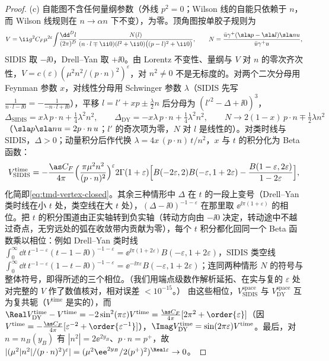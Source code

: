 \begin{proof}
(c) 自能图不含任何量纲参数（外线 $p^2=0$；Wilson 线的自能只依赖于 $n$，而 Wilson 线规则在 $n\to\alpha n$ 下不变），为零。顶角图按单胶子规则为
\[
V=\ii g^2C_F\mu^{2\varepsilon}\!\int\!\frac{\dd^Dl}{(2\pi)^D}\,\frac{N(l)}{(n\cdot l\mp\ii0)(l^2+\ii0)\big((p-l)^2+\ii0\big)},\qquad N=\frac{\bar u\gamma^+(\sla p-\sla l)\sla n u}{\bar u\gamma^+u},
\]
SIDIS 取 $-\ii0$，Drell--Yan 取 $+\ii0$。由 Lorentz 不变性、量纲与 $V$ 对 $n$ 的零次齐次性，$V=c(\varepsilon)(\mu^2n^2/(p\cdot n)^2)^\varepsilon$，对 $n^2\neq0$ 不是无标度的。对两个二次分母用 Feynman 参数 $x$，对线性分母用 Schwinger 参数 $\lambda$（SIDIS 先写 $\frac1{n\cdot l-\ii0}=-\frac1{-n\cdot l+\ii0}$），平移 $l=l'+xp\pm\frac\lambda2n$ 后分母为 $(l'^2-\Delta+\ii0)^3$，
\[
\Delta_{\mathrm{SIDIS}}=x\lambda\,p\cdot n+\tfrac14\lambda^2n^2,\qquad \Delta_{\mathrm{DY}}=-x\lambda\,p\cdot n+\tfrac14\lambda^2n^2,\qquad N\to2(1-x)\,p\cdot n\mp\tfrac12\lambda n^2
\]
（$\sla p\sla n u=2p\cdot n\,u$；$l'$ 的奇次项为零，$N$ 对 $l$ 是线性的）。对类时线与 SIDIS，$\Delta>0$；动量积分后作代换 $\lambda=4x\,(p\cdot n)\,t/n^2$，$x$ 与 $t$ 的积分化为 Beta 函数：
\[
V^{\mathrm{time}}_{\mathrm{SIDIS}}=-\frac{\as C_F}{4\pi}\Big(\frac{\pi\mu^2n^2}{(p\cdot n)^2}\Big)^{\varepsilon}2\Gamma(1+\varepsilon)\Big[B(-2\varepsilon,2)B(-\varepsilon,1+2\varepsilon)-\frac{B(1-\varepsilon,2\varepsilon)}{1-2\varepsilon}\Big],
\]
化简即\cref{eq:tmd-vertex-closed}。其余三种情形中 $\Delta$ 在 $t$ 的一段上变号（Drell--Yan 类时线在小 $t$ 处，类空线在大 $t$ 处），$(\Delta-\ii0)^{-1-\varepsilon}$ 在那里取 $\ee^{\ii\pi(1+\varepsilon)}$ 的相位。把 $t$ 的积分围道由正实轴转到负实轴（转动方向由 $-\ii0$ 决定，转动途中不越过奇点，无穷远处的弧在收敛带内贡献为零），每个 $t$ 积分都化回同一个 Beta 函数乘以相位：例如 Drell--Yan 类时线 $\int_0^\infty\dd t\,t^{-1-\varepsilon}(t-1-\ii0)^{-1-\varepsilon}=\ee^{\ii\pi(1+2\varepsilon)}B(-\varepsilon,1+2\varepsilon)$，SIDIS 类空线 $\int_0^\infty\dd t\,t^{-1-\varepsilon}(1-t-\ii0)^{-1-\varepsilon}=\ee^{-\ii\pi\varepsilon}B(-\varepsilon,1+2\varepsilon)$；连同两种情形 $N$ 的符号与整体符号，即得所述的三个相位。（我们用端点级数作解析延拓、在实与复的 $\varepsilon$ 处对完整的 $V$ 作了数值核对，相对误差 $<10^{-15}$。）%
由这些相位，$V^{\mathrm{space}}_{\mathrm{SIDIS}}$ 与 $V^{\mathrm{space}}_{\mathrm{DY}}$ 互为复共轭（$V^{\mathrm{time}}$ 是实的），而 $\Real V^{\mathrm{time}}_{\mathrm{DY}}-V^{\mathrm{time}}=-2\sin^2(\pi\varepsilon)V^{\mathrm{time}}=\frac{\as C_F}{4\pi}[2\pi^2+\order{\varepsilon}]$（因 $V^{\mathrm{time}}=-\frac{\as C_F}{4\pi}[\varepsilon^{-2}+\order{\varepsilon^{-1}}]$），$\Imag V^{\mathrm{time}}_{\mathrm{DY}}=\sin(2\pi\varepsilon)V^{\mathrm{time}}$。最后，对 $n=n_B(y_B)$ 有 $|n^2|=2\ee^{2y_B}$、$p\cdot n=p^+$，故 $|(\mu^2|n^2|/(p\cdot n)^2)^\varepsilon|=(\mu^2\ee^{2y_B}/2(p^+)^2)^{\Real\varepsilon}\to0$。
\end{proof}

